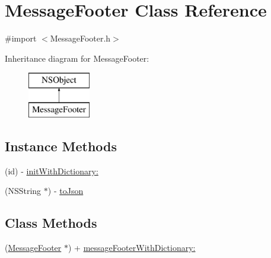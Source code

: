 \hypertarget{interface_message_footer}{\section{Message\-Footer Class Reference}
\label{interface_message_footer}
}


{\ttfamily \#import $<$Message\-Footer.\-h$>$}

Inheritance diagram for Message\-Footer\-:\begin{figure}[H]
\begin{center}
\leavevmode
\includegraphics[height=2.000000cm]{interface_message_footer}
\end{center}
\end{figure}
\subsection*{Instance Methods}
\begin{DoxyCompactItemize}
\item 
(id) -\/ \hyperlink{interface_message_footer_a3b1e5441abacd0398e5b20f9b9c26562}{init\-With\-Dictionary\-:}
\item 
(N\-S\-String $\ast$) -\/ \hyperlink{interface_message_footer_a2aa00d0b1aa63a88cff414b430d5f45b}{to\-Json}
\end{DoxyCompactItemize}
\subsection*{Class Methods}
\begin{DoxyCompactItemize}
\item 
(\hyperlink{interface_message_footer}{Message\-Footer} $\ast$) + \hyperlink{interface_message_footer_a548e464c0f0db19885a77bf2725b8c8c}{message\-Footer\-With\-Dictionary\-:}
\end{DoxyCompactItemize}
